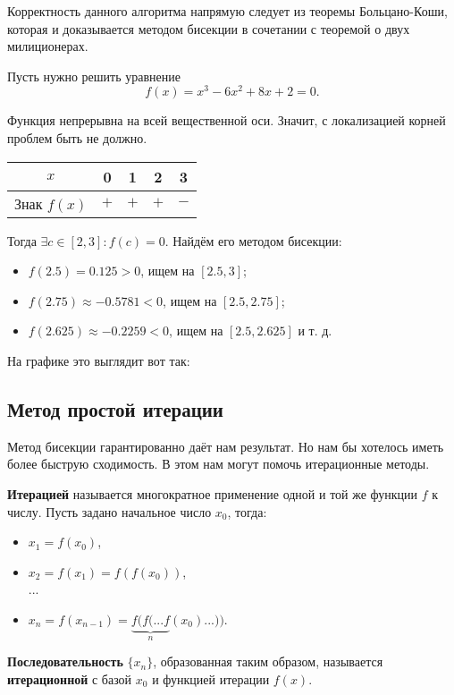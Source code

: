 \documentclass[../main.tex]{subfile}
\begin{document}
Корректность данного алгоритма напрямую следует из теоремы Больцано-Коши, которая
и доказывается методом бисекции в сочетании с теоремой о двух милиционерах.

\begin{example}
	Пусть нужно решить уравнение
	\[f(x)=x^3-6x^2+8x+2=0.\]

	Функция непрерывна на всей вещественной оси. Значит, с локализацией
	корней проблем быть не должно.
	\newline

	\begin{tabular}{ |c|c|c|c|c| }
		\hline
		$x$		& 0	& 1	& 2	& 3 \\
		\hline
		Знак $f(x)$ 	& $+$	& $+$	& $+$	& $-$ \\
		\hline
	\end{tabular}
	\newline

	Тогда $\exists c\in[2,3]: f(c)=0$. Найдём его методом бисекции:
	\begin{itemize}[noitemsep, nolistsep]
		\item $f(2.5)=0.125>0$, ищем на $[2.5,3]$;
		\item $f(2.75)\approx -0.5781<0$, ищем на $[2.5,2.75]$;
		\item $f(2.625)\approx -0.2259<0$, ищем на $[2.5,2.625]$ и т. д.
	\end{itemize}

	На графике это выглядит вот так:\\
	

\end{example}


\subsection{Метод простой итерации}

Метод бисекции гарантированно даёт нам результат. Но нам бы хотелось иметь
более быструю сходимость. В этом нам могут помочь итерационные методы.

\begin{define}
	\textbf{Итерацией} называется многократное применение одной и той же
	функции $f$ к числу. Пусть задано начальное число $x_0$, тогда:
	\begin{itemize}[noitemsep, nolistsep]
		\item $x_1=f(x_0)$,
		\item $x_2=f(x_1)=f(f(x_0))$,\\
		...
		\item $x_n=f(x_{n-1})=\underset{n}{\underbrace{f(f(...f}}
			(x_0)...))$.
	\end{itemize}

	\textbf{Последовательность} $\{x_n\}$, образованная таким образом,
	называется \textbf{итерационной} с базой $x_0$ и функцией итерации $f(x)$.
\end{define}
\end{document}
